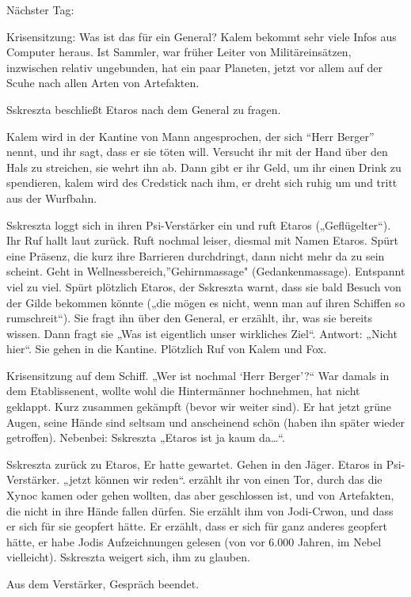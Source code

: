 \documentclass[11pt]{scrartcl}
\begin{document}
Nächster Tag:

Krisensitzung: Was ist das für ein General? Kalem bekommt sehr viele
Infos aus Computer heraus. Ist Sammler, war früher Leiter von
Militäreinsätzen, inzwischen relativ ungebunden, hat ein paar Planeten,
jetzt vor allem auf der Scuhe nach allen Arten von Artefakten.

Sskreszta beschließt Etaros nach dem General zu fragen.

Kalem wird in der Kantine von Mann angesprochen, der sich ``Herr
Berger'' nennt, und ihr sagt, dass er sie töten will. Versucht ihr mit
der Hand über den Hals zu streichen, sie wehrt ihn ab. Dann gibt er ihr
Geld, um ihr einen Drink zu spendieren, kalem wird des Credstick nach
ihm, er dreht sich ruhig um und tritt aus der Wurfbahn.

Sskreszta loggt sich in ihren Psi-Verstärker ein und ruft Etaros
(„Geflügelter``). Ihr Ruf hallt laut zurück. Ruft nochmal leiser,
diesmal mit Namen Etaros. Spürt eine Präsenz, die kurz ihre Barrieren
durchdringt, dann nicht mehr da zu sein scheint. Geht in
Wellnessbereich,''Gehirnmassage" (Gedankenmassage). Entspannt viel zu
viel. Spürt plötzlich Etaros, der Sskreszta warnt, dass sie bald Besuch
von der Gilde bekommen könnte („die mögen es nicht, wenn man auf ihren
Schiffen so rumschreit``). Sie fragt ihn über den General, er erzählt,
ihr, was sie bereits wissen. Dann fragt sie „Was ist eigentlich unser
wirkliches Ziel``. Antwort: „Nicht hier``. Sie gehen in die Kantine.
Plötzlich Ruf von Kalem und Fox.

Krisensitzung auf dem Schiff. „Wer ist nochmal `Herr Berger'?`` War
damals in dem Etablissenent, wollte wohl die Hintermänner hochnehmen,
hat nicht geklappt. Kurz zusammen gekämpft (bevor wir weiter sind). Er
hat jetzt grüne Augen, seine Hände sind seltsam und anscheinend schön
(haben ihn später wieder getroffen). Nebenbei: Sskreszta „Etaros ist ja
kaum da\ldots{}``.

Sskreszta zurück zu Etaros, Er hatte gewartet. Gehen in den Jäger.
Etaros in Psi-Verstärker. „jetzt können wir reden``. erzählt ihr von
einen Tor, durch das die Xynoc kamen oder gehen wollten, das aber
geschlossen ist, und von Artefakten, die nicht in ihre Hände fallen
dürfen. Sie erzählt ihm von Jodi-Crwon, und dass er sich für sie
geopfert hätte. Er erzählt, dass er sich für ganz anderes geopfert
hätte, er habe Jodis Aufzeichnungen gelesen (von vor 6.000 Jahren, im
Nebel vielleicht). Sskreszta weigert sich, ihm zu glauben.

Aus dem Verstärker, Gespräch beendet.
\end{document}

